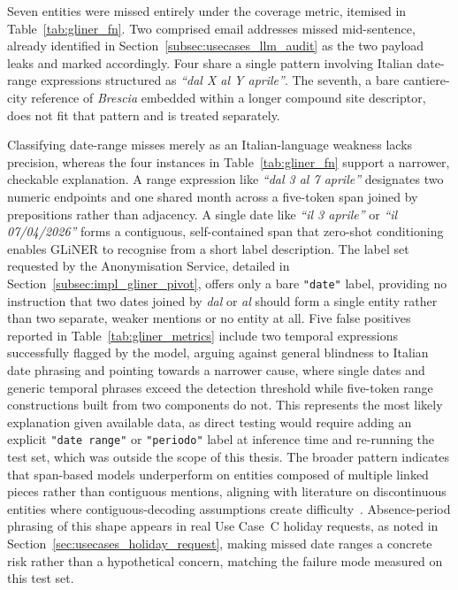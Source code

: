 Seven entities were missed entirely under the coverage metric, itemised in Table~\ref{tab:gliner_fn}. Two comprised email addresses missed mid-sentence, already identified in Section~\ref{subsec:usecases_llm_audit} as the two payload leaks and marked accordingly. Four share a single pattern involving Italian date-range expressions structured as \emph{``dal X al Y aprile''}. The seventh, a bare cantiere-city reference of \emph{Brescia} embedded within a longer compound site descriptor, does not fit that pattern and is treated separately.

Classifying date-range misses merely as an Italian-language weakness lacks precision, whereas the four instances in Table~\ref{tab:gliner_fn} support a narrower, checkable explanation. A range expression like \emph{``dal 3 al 7 aprile''} designates two numeric endpoints and one shared month across a five-token span joined by prepositions rather than adjacency. A single date like \emph{``il 3 aprile''} or \emph{``il 07/04/2026''} forms a contiguous, self-contained span that zero-shot conditioning enables GLiNER to recognise from a short label description. The label set requested by the Anonymisation Service, detailed in Section~\ref{subsec:impl_gliner_pivot}, offers only a bare \texttt{"date"} label, providing no instruction that two dates joined by \emph{dal} or \emph{al} should form a single entity rather than two separate, weaker mentions or no entity at all. Five false positives reported in Table~\ref{tab:gliner_metrics} include two temporal expressions successfully flagged by the model, arguing against general blindness to Italian date phrasing and pointing towards a narrower cause, where single dates and generic temporal phrases exceed the detection threshold while five-token range constructions built from two components do not. This represents the most likely explanation given available data, as direct testing would require adding an explicit \texttt{"date range"} or \texttt{"periodo"} label at inference time and re-running the test set, which was outside the scope of this thesis. The broader pattern indicates that span-based models underperform on entities composed of multiple linked pieces rather than contiguous mentions, aligning with literature on discontinuous entities where contiguous-decoding assumptions create difficulty~\cite{dai2020discontinuous}. Absence-period phrasing of this shape appears in real Use Case~C holiday requests, as noted in Section~\ref{sec:usecases_holiday_request}, making missed date ranges a concrete risk rather than a hypothetical concern, matching the failure mode measured on this test set.

